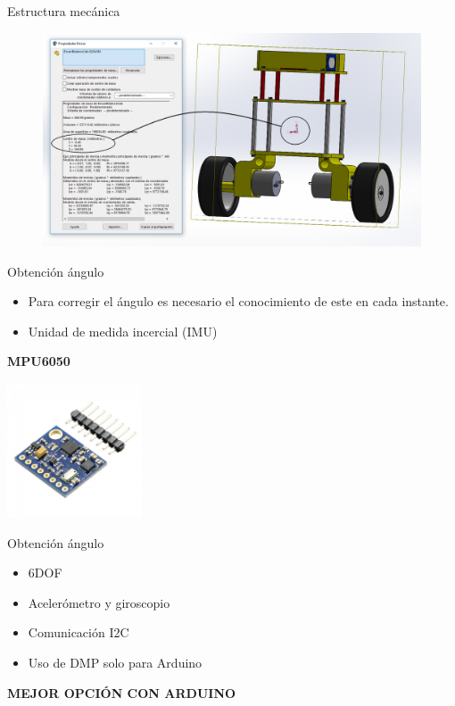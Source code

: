 \documentclass{beamer}
\begin{document}
\begin{frame}{Estructura mecánica}
	\begin{figure}[H]
		\center
		\includegraphics[scale=0.3]{imagenes/Balancing_robot/center_mass}
	\end{figure}
\end{frame}

\begin{frame}{Obtención ángulo}
\begin{block}{}
	\begin{itemize}
		\item Para corregir el ángulo es necesario el conocimiento de este en cada instante.\pause
		\item Unidad de medida incercial (IMU) \pause
	\end{itemize}
\end{block}
\begin{alertblock}{}
	\centering \textbf{MPU6050} \pause
\end{alertblock}
	\begin{center}
	\includegraphics [width =0.3\textwidth ]{imagenes/EstadoArte/IMU1}
\end{center}
\end{frame}

\begin{frame}{Obtención ángulo}
		\begin{block}{}
			\begin{itemize}
				\item 6DOF \pause
				\item Acelerómetro y giroscopio \pause
				\item Comunicación I2C \pause
				\item Uso de DMP solo para Arduino \pause
			\end{itemize}
		\end{block}
		\begin{alertblock}{}
			\centering \textbf{MEJOR OPCIÓN CON ARDUINO} 
		\end{alertblock}
\end{frame}
\end{document}
